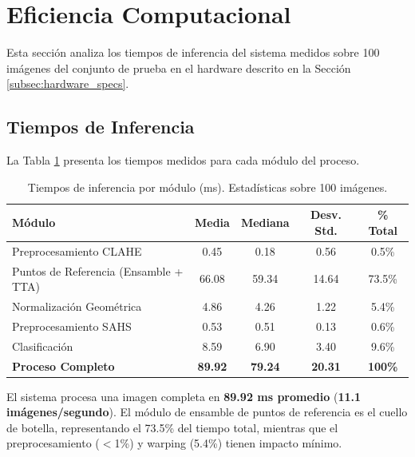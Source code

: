 
\section{Eficiencia Computacional}
\label{sec:eficiencia_computacional}

Esta sección analiza los tiempos de inferencia del sistema medidos sobre 100 imágenes del conjunto de prueba en el hardware descrito en la Sección \ref{subsec:hardware_specs}.

\subsection{Tiempos de Inferencia}
\label{subsec:tiempos_inferencia}

La Tabla \ref{tab:tiempos_inferencia} presenta los tiempos medidos para cada módulo del proceso.

\begin{table}[htbp]
    \centering
    \caption{Tiempos de inferencia por módulo (ms). Estadísticas sobre 100 imágenes.}
    \label{tab:tiempos_inferencia}
    \small
    \begin{tabular}{@{}lcccc@{}}
        \toprule
        \textbf{Módulo} & \textbf{Media} & \textbf{Mediana} & \textbf{Desv. Std.} & \textbf{\% Total} \\
        \midrule
        Preprocesamiento CLAHE & 0.45 & 0.18 & 0.56 & 0.5\% \\
        Puntos de Referencia (Ensamble + TTA) & 66.08 & 59.34 & 14.64 & 73.5\% \\
        Normalización Geométrica & 4.86 & 4.26 & 1.22 & 5.4\% \\
        Preprocesamiento SAHS & 0.53 & 0.51 & 0.13 & 0.6\% \\
        Clasificación & 8.59 & 6.90 & 3.40 & 9.6\% \\
        \midrule
        \textbf{Proceso Completo} & \textbf{89.92} & \textbf{79.24} & \textbf{20.31} & \textbf{100\%} \\
        \bottomrule
    \end{tabular}
\end{table}

El sistema procesa una imagen completa en \textbf{89.92 ms promedio} (\textbf{11.1 imágenes/segundo}). El módulo de ensamble de puntos de referencia es el cuello de botella, representando el 73.5\% del tiempo total, mientras que el preprocesamiento ($<$1\%) y warping (5.4\%) tienen impacto mínimo.

